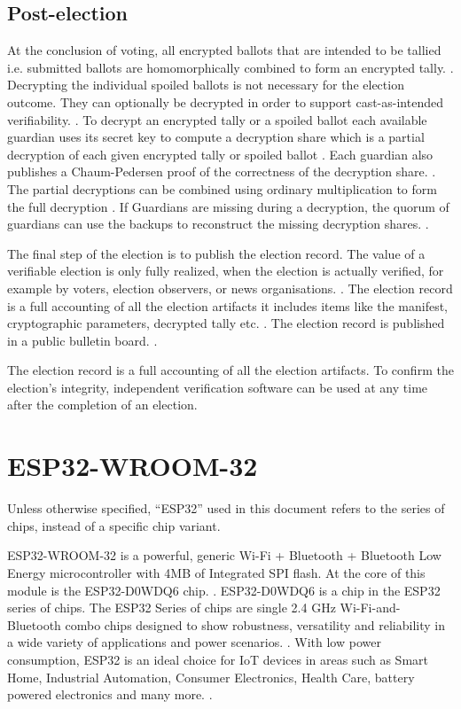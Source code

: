 \subsection{Post-election}
At the conclusion of voting, all encrypted ballots that are intended to be tallied i.e. submitted ballots are homomorphically combined to form an encrypted tally. \cite[5]{eg-spec} \cite[18]{eg-spec} \cite[15]{eg-paper}. Decrypting the individual spoiled ballots is not necessary for the election outcome. They can optionally be decrypted in order to support cast-as-intended verifiability. \cite[17]{eg-paper}. To decrypt an encrypted tally or a spoiled ballot each available guardian uses its secret key to compute a decryption share which is a partial decryption of each given encrypted tally or spoiled ballot \cite[18]{eg-spec} \cite[15]{eg-paper}. Each guardian also publishes a Chaum-Pedersen proof of the correctness of the decryption share. \cite[18]{eg-spec}. The partial decryptions can be combined using ordinary multiplication to form the full decryption \cite{eg-docs}. If Guardians are missing during a decryption, the quorum of guardians can use the backups to reconstruct the missing decryption shares. \cite{eg-docs}. 

The final step of the election is to publish the election record. The value of a verifiable election is only fully realized, when the election is actually verified, for example by voters, election observers, or news organisations. \cite[17]{eg-spec}. The election record is a full accounting of all the election artifacts it includes items like the manifest, cryptographic parameters, decrypted tally etc. \cite[24]{eg-spec}. The election record is published in a public bulletin board. \cite[17]{eg-spec}. 

The election record is a full accounting of all the election artifacts. To confirm the election's integrity, independent verification software can be used at any time after the completion of an election. \cite[6]{eg-paper}

\section{ESP32-WROOM-32}
Unless otherwise specified, “ESP32” used in this document refers to the series of chips, instead of a specific chip variant.



ESP32-WROOM-32 is a powerful, generic Wi-Fi + Bluetooth + Bluetooth Low Energy microcontroller with 4MB of Integrated SPI flash. At the core of this module is the ESP32-D0WDQ6 chip. \cite[6]{esü32-module}. ESP32-D0WDQ6 is a chip in the ESP32 series of chips. The ESP32 Series of chips are single 2.4 GHz Wi-Fi-and-Bluetooth combo chips designed to show robustness, versatility and reliability in a wide variety of applications and power scenarios. \cite[2]{esp32-series}. With low power consumption, ESP32 is an ideal choice for IoT devices in areas such as Smart Home, Industrial Automation, Consumer Electronics, Health Care, battery powered electronics and many more. \cite[5]{esp32-series} \cite[6]{esp32-module}.  

